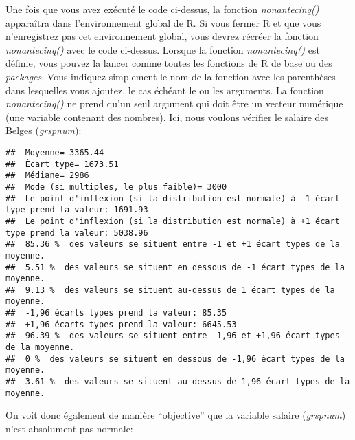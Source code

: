 \documentclass[
]{book}
\newenvironment{Shaded}{\begin{snugshade}}{\end{snugshade}}
\newcommand{\FunctionTok}[1]{\textcolor[rgb]{0.00,0.00,0.00}{#1}}
\newcommand{\NormalTok}[1]{#1}
\newcommand{\SpecialCharTok}[1]{\textcolor[rgb]{0.00,0.00,0.00}{#1}}
\begin{document}
Une fois que vous avez exécuté le code ci-dessus, la fonction \emph{nonantecinq()} apparaîtra dans l'\protect\hyperlink{objets_envir}{environnement global} de R. Si vous fermer R et que vous n'enregistrez pas cet \protect\hyperlink{objets_envir}{environnement global}, vous devrez récréer la fonction \emph{nonantecinq()} avec le code ci-dessus. Lorsque la fonction \emph{nonantecinq()} est définie, vous pouvez la lancer comme toutes les fonctions de R de base ou des \emph{packages}. Vous indiquez simplement le nom de la fonction avec les parenthèses dans lesquelles vous ajoutez, le cas échéant le ou les arguments. La fonction \emph{nonantecinq()} ne prend qu'un seul argument qui doit être un vecteur numérique (une variable contenant des nombres). Ici, nous voulons vérifier le salaire des Belges (\emph{grspnum}):

\begin{Shaded}
\end{Shaded}

\begin{verbatim}
##  Moyenne= 3365.44 
##  Écart type= 1673.51 
##  Médiane= 2986 
##  Mode (si multiples, le plus faible)= 3000 
##  Le point d'inflexion (si la distribution est normale) à -1 écart type prend la valeur: 1691.93 
##  Le point d'inflexion (si la distribution est normale) à +1 écart type prend la valeur: 5038.96 
##  85.36 %  des valeurs se situent entre -1 et +1 écart types de la moyenne. 
##  5.51 %  des valeurs se situent en dessous de -1 écart types de la moyenne. 
##  9.13 %  des valeurs se situent au-dessus de 1 écart types de la moyenne. 
##  -1,96 écarts types prend la valeur: 85.35 
##  +1,96 écarts types prend la valeur: 6645.53 
##  96.39 %  des valeurs se situent entre -1,96 et +1,96 écart types de la moyenne. 
##  0 %  des valeurs se situent en dessous de -1,96 écart types de la moyenne. 
##  3.61 %  des valeurs se situent au-dessus de 1,96 écart types de la moyenne.
\end{verbatim}

On voit donc également de manière ``objective'' que la variable salaire (\emph{grspnum}) n'est absolument pas normale:
\end{document}
